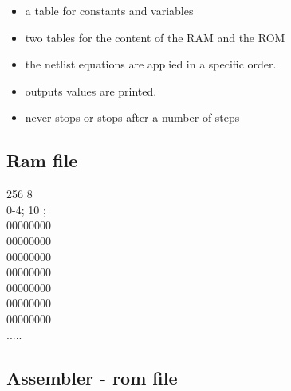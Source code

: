 \documentclass[c]{beamer}
\begin{document}
\begin{frame}
\begin{itemize}
\item a table for constants and variables
\newline
\item two tables for the content of the RAM and the ROM
\newline
\item the netlist equations are applied in a specific order.
\newline
\item outputs values are printed.
\newline
\item never stops or stops after a number of steps
\end{itemize}
\end{frame}

\subsection{Ram file}

\begin{frame}
256 8 \\
0-4; 10 ;  \\
00000000\\
00000000\\
00000000\\
00000000\\
00000000\\
00000000\\
00000000\\
.....
\end{frame}

\subsection{Assembler - rom file}
\end{document}
